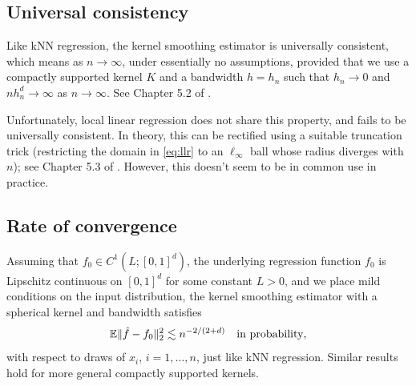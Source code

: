 \documentclass{article}
\begin{document}
\subsection{Universal consistency}

Like kNN regression, the kernel smoothing estimator is universally consistent,
which means  as $n \to \infty$, under
essentially no assumptions, provided that we use a compactly supported kernel
$K$ and a bandwidth $h=h_n$ such that $h_n \to 0$ and $nh_n^d \to \infty$ as $n
\to \infty$. See Chapter 5.2 of \citet{gyorfi2002distribution}.  

Unfortunately, local linear regression does not share this property, and fails
to be universally consistent. In theory, this can be rectified using a suitable
truncation trick (restricting the domain in \eqref{eq:llr} to an $\ell_\infty$
ball whose radius diverges with $n$); see Chapter 5.3 of
\citet{gyorfi2002distribution}. However,  this doesn't seem to be in common use
in practice.    

\subsection{Rate of convergence}

Assuming that $f_0 \in C^1(L; [0,1]^d)$, the underlying regression function
$f_0$ is Lipschitz continuous on $[0,1]^d$ for some constant $L>0$, and we place
mild conditions on the input distribution, the kernel smoothing estimator with a  
spherical kernel and bandwidth  satisfies    
\begin{equation}
\label{eq:kernel_rate}
\mathbb{E}\|\hat{f} - f_0\|_2^2 \lesssim n^{-2/(2+d)} \quad \text{in probability},
\end{equation}
with respect to draws of $x_i$, $i=1,\dots,n$, just like kNN regression. Similar
results hold for more general compactly supported kernels. 
\end{document}
